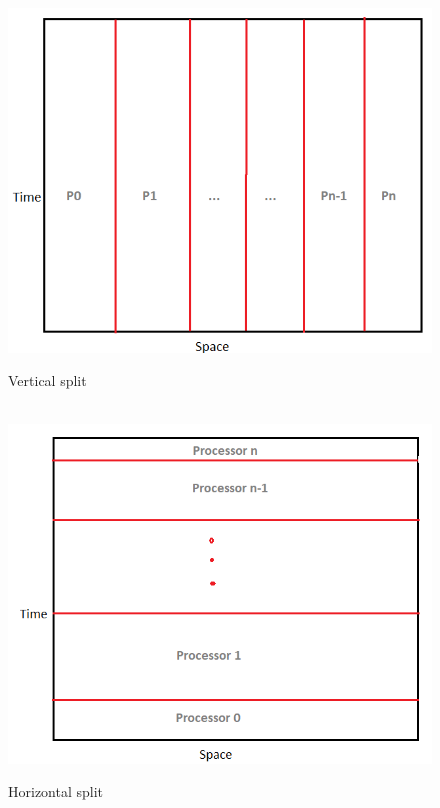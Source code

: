 \documentclass[12pt, a4paper]{report}
\begin{document}
\begin{figure}
  \includegraphics[width=\linewidth]{report/vertical.png}
  \caption{Vertical split}\
\endminipage\hfill
{}
  \includegraphics[width=\linewidth]{report/horizontal}
  \caption{Horizontal split}
\endminipage\hfill
\end{figure}
\end{document}
